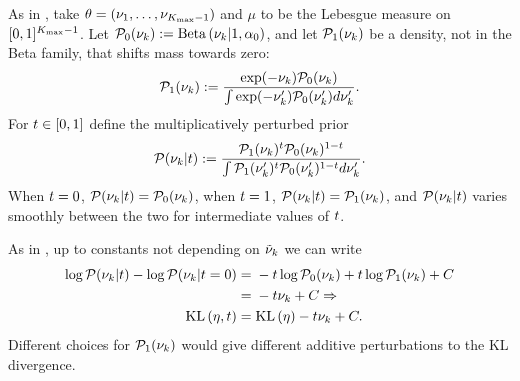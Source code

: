 \begin{ex}
%
As in , take $\theta = (\nu_1, \ldots, \nu_{{K_{\mathrm{max}}}-1})$
and $\mu$ to be the Lebesgue measure on $[0,1]^{{K_{\mathrm{max}}}-1}$. Let $\mathcal{P}_{0}(\nu_{k}) :=
\mathrm{Beta}\left(\nu_{k} \vert 1, \alpha_0\right)$, and let $\mathcal{P}_{1}(\nu_{k})$ be a density, not
in the Beta family, that shifts mass towards zero:
%
\begin{align*}
%
\palt(\nuk) :=
    \frac{\exp(-\nuk)\pbase(\nuk)}{\int \exp(-\nuk')\pbase(\nuk') d\nuk'}.
%
\end{align*}
%
For $t \in [0,1]$ define the multiplicatively perturbed prior
%
\begin{align*}
%
\p(\nuk \vert \t) :=
    \frac{\palt(\nuk)^{\t} \pbase(\nuk)^{1-\t}}
         {\int \palt(\nuk')^{\t} \pbase(\nuk')^{1-\t} d\nuk'}.
%
\end{align*}
%
When $t = 0$, $\mathcal{P}(\nu_{k} \vert t) = \mathcal{P}_{0}(\nu_{k})$, when $t = 1$,
$\mathcal{P}(\nu_{k} \vert t)  = \mathcal{P}_{1}(\nu_{k})$, and $\mathcal{P}(\nu_{k} \vert t)$ varies smoothly
between the two for intermediate values of $t$.

As in , up to constants not depending on
$\tilde{\nu}_{k}$ we can write
%
\begin{align*}
%
\log \p(\nuk \vert \t) - \log \p(\nuk \vert \t=0) ={}&
    -\t \log \pbase(\nuk) + \t \log \palt(\nuk) + \const
\\={}& -\t \nuk + \const \Rightarrow
\\
\KL{\eta, \t} ={}& \KL{\eta} -\t \nuk + \const.
%
\end{align*}
%
Different choices for $\mathcal{P}_{1}(\nu_{k})$ would give different additive
perturbations to the KL divergence.
%
\end{ex}
%
